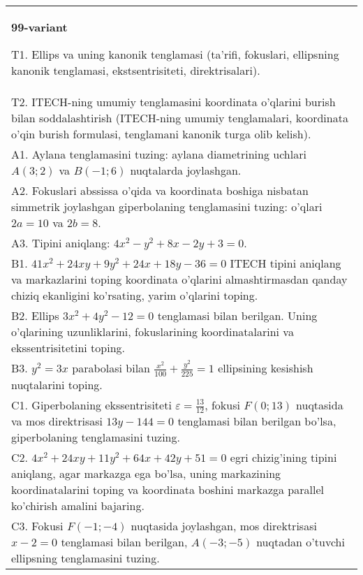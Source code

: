 \documentclass{article}
\begin{document}
\begin{tabular}{m{17cm}}
\textbf{99-variant}
\newline

T1. Ellips va uning kanonik tenglamasi (ta'rifi, fokuslari, ellipsning kanonik tenglamasi, ekstsentrisiteti, direktrisalari).\\

T2. ITECH-ning umumiy tenglamasini koordinata o'qlarini burish bilan soddalashtirish (ITECH-ning umumiy tenglamalari, koordinata o'qin burish formulasi, tenglamani kanonik turga olib kelish).\\

A1. Aylana tenglamasini tuzing: aylana diametrining uchlari $A(3;2)$ va $B(-1;6)$ nuqtalarda joylashgan.\\

A2. Fokuslari abssissa o'qida va koordinata boshiga nisbatan simmetrik joylashgan giperbolaning tenglamasini tuzing: o'qlari $2a=10$ va $2b=8$.\\

A3. Tipini aniqlang: $4x^{2}-y^{2}+8x-2y+3=0$.\\

B1. $41x^{2} + 24xy + 9y^{2} + 24x + 18y - 36 = 0$ ITECH tipini aniqlang va markazlarini toping koordinata o'qlarini almashtirmasdan qanday chiziq ekanligini ko'rsating, yarim o'qlarini toping.  \\

B2. Ellips $3x^{2} + 4y^{2} - 12 = 0$ tenglamasi bilan berilgan. Uning o'qlarining uzunliklarini, fokuslarining koordinatalarini va ekssentrisitetini toping.  \\

B3. $y^{2} = 3x$ parabolasi bilan $\frac{x^{2}}{100} + \frac{y^{2}}{225} = 1$ ellipsining kesishish nuqtalarini toping.  \\

C1. Giperbolaning ekssentrisiteti $\varepsilon = \frac{13}{12}$, fokusi $F(0;13)$ nuqtasida va mos direktrisasi $13y - 144 = 0$ tenglamasi bilan berilgan bo'lsa, giperbolaning tenglamasini tuzing.  \\

C2. $4x^{2} + 24xy + 11y^{2} + 64x + 42y + 51 = 0$ egri chizig'ining tipini aniqlang, agar markazga ega bo'lsa, uning markazining koordinatalarini toping va koordinata boshini markazga parallel ko'chirish amalini bajaring.\\

C3. Fokusi $F( - 1; - 4)$ nuqtasida joylashgan, mos direktrisasi $x - 2 = 0$ tenglamasi bilan berilgan, $A( - 3; - 5)$ nuqtadan o'tuvchi ellipsning tenglamasini tuzing.  \\

\end{tabular}
\vspace{1cm}
\end{document}
